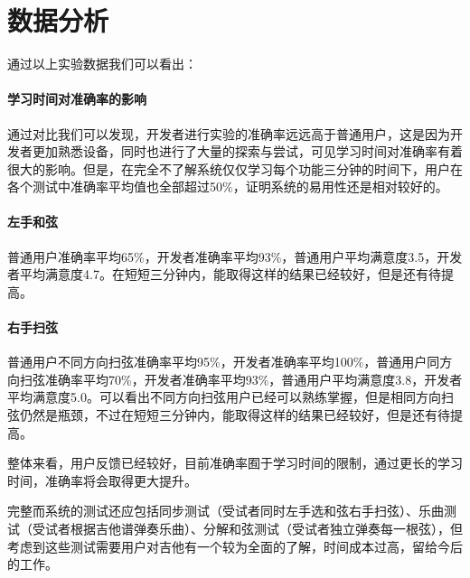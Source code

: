     \section{数据分析}

        通过以上实验数据我们可以看出：

        \paragraph{学习时间对准确率的影响} 通过对比我们可以发现，开发者进行实验的准确率远远高于普通用户，这是因为开发者更加熟悉设备，同时也进行了大量的探索与尝试，可见学习时间对准确率有着很大的影响。但是，在完全不了解系统仅仅学习每个功能三分钟的时间下，用户在各个测试中准确率平均值也全部超过50\%，证明系统的易用性还是相对较好的。

        \paragraph{左手和弦} 普通用户准确率平均65\%，开发者准确率平均93\%，普通用户平均满意度3.5，开发者平均满意度4.7。在短短三分钟内，能取得这样的结果已经较好，但是还有待提高。

        \paragraph{右手扫弦} 普通用户不同方向扫弦准确率平均95\%，开发者准确率平均100\%，普通用户同方向扫弦准确率平均70\%，开发者准确率平均93\%，普通用户平均满意度3.8，开发者平均满意度5.0。可以看出不同方向扫弦用户已经可以熟练掌握，但是相同方向扫弦仍然是瓶颈，不过在短短三分钟内，能取得这样的结果已经较好，但是还有待提高。

        整体来看，用户反馈已经较好，目前准确率囿于学习时间的限制，通过更长的学习时间，准确率将会取得更大提升。

        完整而系统的测试还应包括同步测试（受试者同时左手选和弦右手扫弦）、乐曲测试（受试者根据吉他谱弹奏乐曲）、分解和弦测试（受试者独立弹奏每一根弦），但考虑到这些测试需要用户对吉他有一个较为全面的了解，时间成本过高，留给今后的工作。


